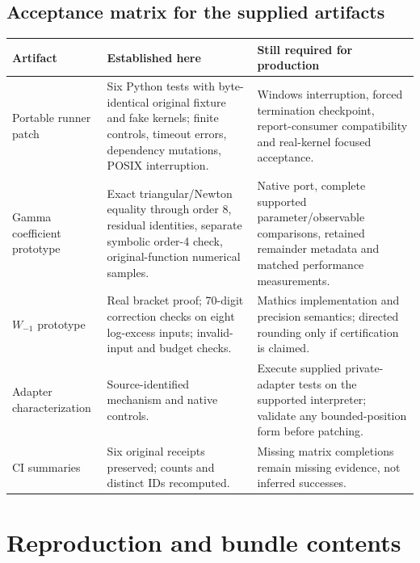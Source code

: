 \documentclass[11pt,letterpaper]{article}
\newcommand{\code}[1]{\texttt{\detokenize{#1}}}
\begin{document}
\subsection{Acceptance matrix for the supplied artifacts}
\begin{longtable}{@{}P{0.24\textwidth}P{0.35\textwidth}P{0.33\textwidth}@{}}
\toprule
Artifact & Established here & Still required for production\\\midrule\endhead
Portable runner patch & Six Python tests with byte-identical original fixture and fake kernels; finite controls, timeout errors, dependency mutations, POSIX interruption. & Windows interruption, forced termination checkpoint, report-consumer compatibility and real-kernel focused acceptance.\\
Gamma coefficient prototype & Exact triangular/Newton equality through order 8, residual identities, separate symbolic order-4 check, original-function numerical samples. & Native port, complete supported parameter/observable comparisons, retained remainder metadata and matched performance measurements.\\
$W_{-1}$ prototype & Real bracket proof; 70-digit correction checks on eight log-excess inputs; invalid-input and budget checks. & Mathics implementation and precision semantics; directed rounding only if certification is claimed.\\
Adapter characterization & Source-identified \code{FirstPosition} mechanism and native \code{Limit} controls. & Execute supplied private-adapter tests on the supported interpreter; validate any bounded-position form before patching.\\
CI summaries & Six original receipts preserved; counts and distinct IDs recomputed. & Missing matrix completions remain missing evidence, not inferred successes.\\\bottomrule
\end{longtable}

\section{Reproduction and bundle contents}
\end{document}

